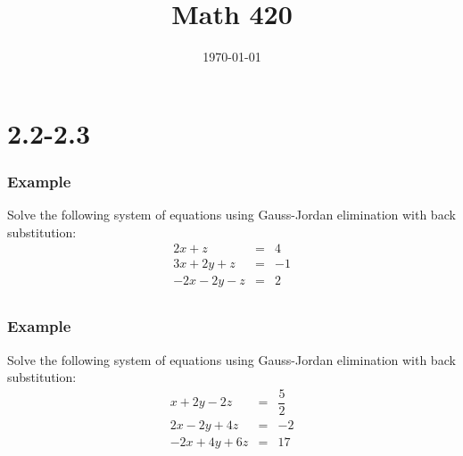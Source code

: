 \documentclass{beamer}
\title{Math 420}
\date{\today}
\begin{document}
\begin{frame}
\end{frame}

\section{2.2-2.3}
\begin{frame}[t]
\frametitle{Example}
Solve the following system of equations using Gauss-Jordan elimination with back substitution:
\begin{eqnarray*}
2x+z&=&4 \\
3x+2y+z&=&-1\\
-2x-2y-z&=&2\\
\end{eqnarray*}
\end{frame}
\begin{frame}
\end{frame}
\begin{frame}
\end{frame}
\begin{frame}
\end{frame}
\begin{frame}
\end{frame}
\begin{frame}[t]
\frametitle{Example}
Solve the following system of equations using Gauss-Jordan elimination with back substitution: 
\begin{eqnarray*}
x + 2y - 2z &=& \dfrac{5}{2} \\
2x-2y+4z&=&-2 \\ 
-2x+4y+6z &=& 17
\end{eqnarray*}

\end{frame}

\begin{frame}
\end{frame}
\begin{frame}
\end{frame}
\begin{frame}
\end{frame}
\begin{frame}
\end{frame}
\end{document}
